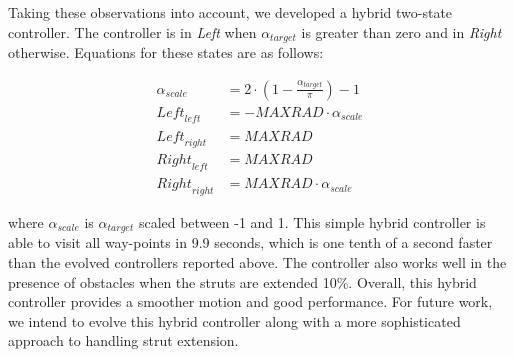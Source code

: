 Taking these observations into account, we developed a hybrid two-state controller. The controller is in \emph{Left} when $\alpha_{\mathit{target}}$ is greater than zero and in \emph{Right} otherwise. Equations for these states are as follows:


\begin{align}
    \alpha_\mathit{scale} &= 2\cdot(1 - \frac{\alpha_{\mathit{target}}}{\pi}) - 1\\
    \mathit{Left}_\mathit{left} &= -\mathit{MAXRAD} \cdot \alpha_\mathit{scale}\\
    \mathit{Left}_\mathit{right} &= \mathit{MAXRAD}\\
    \mathit{Right}_\mathit{left} &= \mathit{MAXRAD}\\
    \mathit{Right}_\mathit{right} &= \mathit{MAXRAD}\cdot \alpha_\mathit{scale}
\end{align}

\noindent
where $\alpha_\mathit{scale}$ is $\alpha_{\mathit{target}}$ scaled between -1 and 1. This simple hybrid controller is able to visit all way-points in 9.9 seconds, which is one tenth of a second faster than the evolved controllers reported above. The controller also works well in the presence of obstacles when the struts are extended 10\%. Overall, this hybrid controller provides a smoother motion and good performance. For future work, we intend to evolve this hybrid controller along with a more sophisticated approach to handling strut extension.
